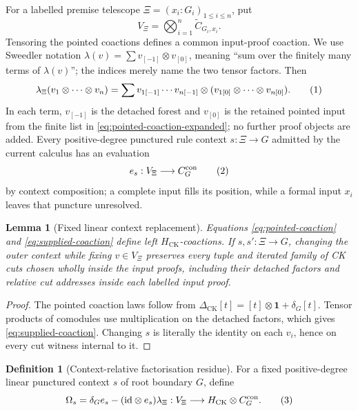 \documentclass[10pt,a4paper]{article}
\theoremstyle{plain}
\newtheorem{lemma}[theorem]{Lemma}
\theoremstyle{definition}
\newtheorem{definition}[theorem]{Definition}
\theoremstyle{remark}
\newcommand{\HCK}{H_{\mathrm{CK}}}
\newcommand{\DeltaCK}{\Delta_{\mathrm{CK}}}
\newcommand{\one}{\mathbf 1}
\newcommand{\eqtag}{\refstepcounter{equation}\tag{\theequation}}
\begin{document}
For a labelled premise telescope
\(\Xi=(x_i:G_i)_{1\le i\le n}\), put
\[
 V_\Xi=\bigotimes_{i=1}^n\widetilde C_{G_i,x_i}.
\]
Tensoring the pointed coactions defines a common input-proof coaction.
We use Sweedler notation
\(\lambda(v)=\sum v_{[-1]}\otimes v_{[0]}\), meaning ``sum over the
finitely many terms of \(\lambda(v)\)''; the indices merely name the two
tensor factors.  Then
\[
\lambda_\Xi(v_1\otimes\cdots\otimes v_n)
   =\sum v_{1[-1]}\cdots v_{n[-1]}\otimes
        (v_{1[0]}\otimes\cdots\otimes v_{n[0]}).
\eqtag\label{eq:supplied-coaction}
\]
In each term, \(v_{[-1]}\) is the detached forest and \(v_{[0]}\) is the
retained pointed input from the finite list in
\eqref{eq:pointed-coaction-expanded}; no further proof objects are added.
Every positive-degree punctured rule context
\(s:\Xi\to G\) admitted by the current calculus has an evaluation
\[
 e_s:V_\Xi\longrightarrow C_G^{\mathrm{con}}
\eqtag\label{eq:context-evaluation-map}
\]
by context composition; a complete input fills its position, while a
formal input \(x_i\) leaves that puncture unresolved.

\begin{lemma}[Fixed linear context replacement]
\label{lem:fixed-input-regions}
Equations \eqref{eq:pointed-coaction} and
\eqref{eq:supplied-coaction} define left \(\HCK\)-coactions.  If
\(s,s':\Xi\to G\), changing the outer context while fixing
\(v\in V_\Xi\) preserves every tuple and iterated family of CK cuts
chosen wholly inside the input proofs, including their detached factors and
relative cut addresses inside each labelled input proof.
\end{lemma}

\begin{proof}
The pointed coaction laws follow from
\(
 \DeltaCK[t]=[t]\otimes\one+\delta_G[t]
\).
Tensor products of comodules use multiplication on the detached factors,
which gives \eqref{eq:supplied-coaction}.  Changing \(s\) is literally the
identity on each \(v_i\), hence on every cut witness internal to it.
\end{proof}

\begin{definition}[Context-relative factorisation residue]
\label{def:context-relative-residue}
For a fixed positive-degree linear punctured context \(s\) of root
boundary \(G\), define
\[
\Omega_s
   =\delta_Ge_s-(\mathrm{id}\otimes e_s)\lambda_\Xi:
      V_\Xi\longrightarrow\HCK\otimes C_G^{\mathrm{con}} .
\eqtag\label{eq:context-relative-residue}
\]
\end{definition}
\end{document}
